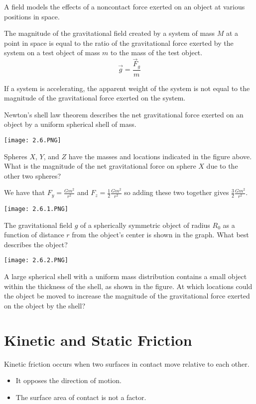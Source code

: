 \documentclass[../mech.tex]{subfiles}
\begin{document}
A field models the effects of a noncontact force exerted on an object at various positions in space.

The magnitude of the gravitational field created by a system of mass $M$ at a point in space is equal to the ratio of the gravitational force exerted by the system on a test object of mass $m$ to the mass of the test object. 
\[ \vec{g}=\frac{\vec{F}_g}{m} \]

If a system is accelerating, the apparent weight of the system is not equal to the magnitude of the gravitational force exerted on the system.

Newton's shell law theorem describes the net gravitational force exerted on an object by a uniform spherical shell of mass.

\begin{example}
    \begin{center}
        \texttt{[image: 2.6.PNG]}
    \end{center}
    Spheres $X$, $Y$, and $Z$ have the masses and locations indicated in the figure above. What is the magnitude of the net gravitational force on sphere $X$ due to the other two spheres?

    We have that $F_y=\frac{Gm^2}{r^2}$ and $F_z= \frac{1}{2}\frac{Gm^2}{r^2}$ so adding these two together gives $\frac{3}{2}\frac{Gm^2}{r^2}$.
\end{example}

\pagebreak
\ex \begin{center}
    \texttt{[image: 2.6.1.PNG]}
\end{center}
The gravitational field $g$ of a spherically symmetric object of radius $R_0$ as a function of distance $r$ from the object's center is shown in the graph. What best describes the object?

\ex \begin{center}
    \texttt{[image: 2.6.2.PNG]}
\end{center}
A large spherical shell with a uniform mass distribution contains a small object within the thickness of the shell, as shown in the figure. At which locations could the object be moved to increase the magnitude of the gravitational force exerted on the object by the shell?

\section{Kinetic and Static Friction}
Kinetic friction occurs when two surfaces in contact move relative to each other.
\begin{itemize}
    \item It opposes the direction of motion.
    \item The surface area of contact is not a factor.
\end{itemize}
\end{document}

